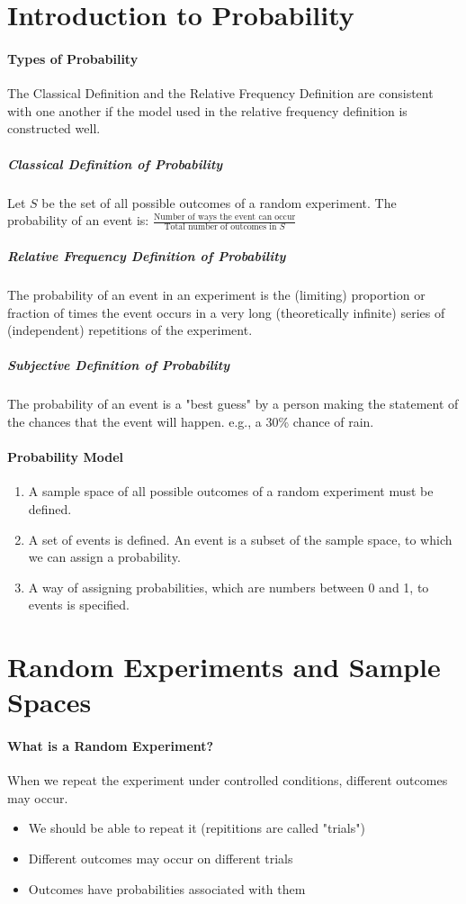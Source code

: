 \documentclass[10pt,letter]{article}
\begin{document}
\section*{Introduction to Probability}

\paragraph{Types of Probability}
The Classical Definition and the Relative Frequency Definition are consistent with one another if the model used in the relative frequency definition is constructed well. 

\subparagraph{Classical Definition of Probability}
Let $S$ be the set of all possible outcomes of a random experiment. The probability of an event is: $\frac{\text{Number of ways the event can occur}}{\text{Total number of outcomes in }S}$

\subparagraph{Relative Frequency Definition of Probability}
The probability of an event in an experiment is the (limiting) proportion or fraction of times the event occurs in a very long (theoretically infinite) series of (independent) repetitions of the experiment.

\subparagraph{Subjective Definition of Probability}
The probability of an event is a "best guess" by a person making the statement of the chances that the event will happen. e.g., a 30\% chance of rain.

\paragraph{Probability Model}
\begin{enumerate}
    \item A sample space of all possible outcomes of a random experiment must be defined.
    \item A set of events is defined. An event is a subset of the sample space, to which we can assign a probability. 
    \item A way of assigning probabilities, which are numbers between 0 and 1, to events is specified. 
\end{enumerate}

\section*{Random Experiments and Sample Spaces}
\paragraph{What is a Random Experiment?}
When we repeat the experiment under controlled conditions, different outcomes may occur. 
\begin{itemize}
    \item We should be able to repeat it (repititions are called "trials")
    \item Different outcomes may occur on different trials
    \item Outcomes have probabilities associated with them
\end{itemize}
\end{document}
